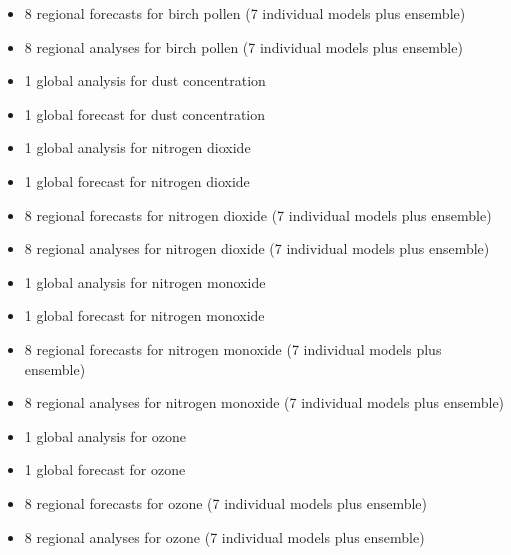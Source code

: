 \documentclass[9pt]{report}
\begin{document}
\begin{itemize}[noitemsep,topsep=\mdcompacttopsep]%

\item{}8 regional forecasts for birch pollen (7 individual models plus ensemble)%

\item{}8 regional analyses for birch pollen (7 individual models plus ensemble)%

\item{}1 global analysis for dust concentration%

\item{}1 global forecast for dust concentration%

\item{}1 global analysis for nitrogen dioxide%

\item{}1 global forecast for nitrogen dioxide%

\item{}8 regional forecasts for nitrogen dioxide (7 individual models plus ensemble)%

\item{}8 regional analyses for nitrogen dioxide (7 individual models plus ensemble)%

\item{}1 global analysis for nitrogen monoxide%

\item{}1 global forecast for nitrogen monoxide%

\item{}8 regional forecasts for nitrogen monoxide (7 individual models plus ensemble)%

\item{}8 regional analyses for nitrogen monoxide (7 individual models plus ensemble)%

\item{}1 global analysis for ozone%

\item{}1 global forecast for ozone%

\item{}8 regional forecasts for ozone (7 individual models plus ensemble)%

\item{}8 regional analyses for ozone (7 individual models plus ensemble) %
\end{itemize}%
\end{document}
